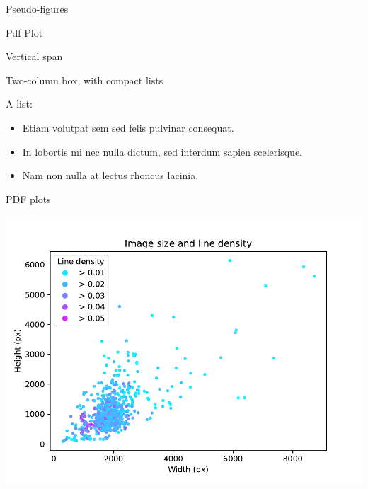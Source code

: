 \documentclass[a0paper,portrait]{baposter}
\newcommand{\compresslist}{
	\setlength{\itemsep}{0pt}%
	\setlength{\parskip}{1pt}%
	\setlength{\parsep}{0pt}%
}
\begin{document}
\begin{poster}
\begin{posterbox}[name=pseudo-figure,column=0,below=introduction,span=1]{Pseudo-figures}
        \lipsum*[2][1-5]
\end{posterbox}

\begin{posterbox}[name=pdf-plot,column=1,below=introduction,span=1]{Pdf Plot}
	\lipsum*[5]

	\lipsum*[7][5-8]
\end{posterbox}

\begin{posterbox}[name=vertical-box,column=2,below=introduction]{Vertical span}
\lipsum[10-12]

\lipsum*[1][9-11]
\end{posterbox}



\begin{posterbox}[name=two-column-box,column=0,span=2,below=pseudo-figure]{Two-column box, with compact lists}

\begin{multicols}{2}
	A list:
	\begin{itemize}
        \compresslist
		\item Etiam volutpat sem sed felis pulvinar consequat.
		\item In lobortis mi nec nulla dictum, sed interdum sapien scelerisque.
		\item Nam non nulla at lectus rhoncus lacinia.
	\end{itemize}
    \lipsum[1-2]
\end{multicols}

\end{posterbox}

\begin{posterbox}[name=pdfplots,column=0,below=two-column-box,span=2,above=bottom]{PDF plots}
	\begin{minipage}{.48\linewidth}
		\lipsum[5]
	\end{minipage}\hfill
	\begin{minipage}{.48\linewidth}
	\includegraphics[width=\textwidth]{img_size_scatter_plot.pdf}
	\end{minipage}%
\end{posterbox}




\end{poster}
\end{document}
